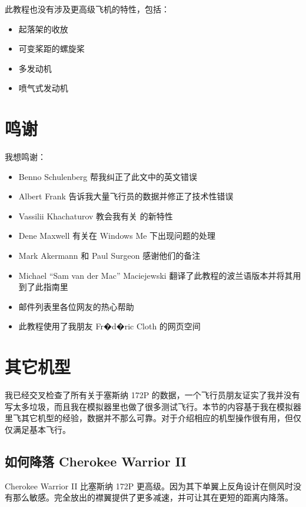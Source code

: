 \begin{itemize}
此教程也没有涉及更高级飞机的特性，包括：

\begin{itemize}
  \item 起落架的收放
  \item 可变桨距的螺旋桨
  \item 多发动机
  \item 喷气式发动机
\end{itemize}

\section{鸣谢}

我想鸣谢：
\begin{itemize}
\item Benno Schulenberg 帮我纠正了此文中的英文错误
\item Albert Frank 告诉我大量飞行员的数据并修正了技术性错误
\item Vassilii Khachaturov 教会我有关 \FlightGear{} 的新特性
\item Dene Maxwell 有关在 Windows Me 下出现问题的处理
\item Mark Akermann 和 Paul Surgeon 感谢他们的备注
\item Michael ``Sam van der Mac'' Maciejewski 翻译了此教程的波兰语版本并将其用到了此指南里
\item \FlightGear{} 邮件列表里各位网友的热心帮助
\item {} 此教程使用了我朋友 Fr�d�ric Cloth 的网页空间
\end{itemize}

\section{其它机型}

我已经交叉检查了所有关于塞斯纳 172P 的数据，一个飞行员朋友证实了我并没有写太多垃圾，而且我在模拟器里也做了很多测试飞行。本节的内容基于我在模拟器里飞其它机型的经验，数据并不那么可靠。对于介绍相应的机型操作很有用，但仅仅满足基本飞行。

\subsection{如何降落 Cherokee Warrior II}
\label{sec:Cherokee}

Cherokee Warrior II 比塞斯纳 172P 更高级。因为其下单翼上反角设计在侧风时没有那么敏感。完全放出的襟翼提供了更多减速，并可让其在更短的距离内降落。


\end{itemize}
